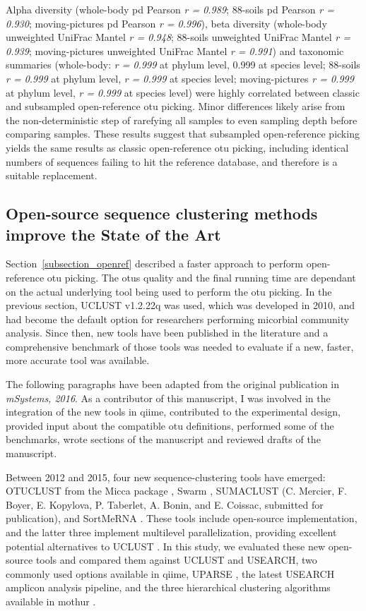 Alpha diversity (whole-body \gls{pd} Pearson \emph{r = 0.989}; 88-soils \gls{pd}
Pearson \emph{r = 0.930}; moving-pictures \gls{pd} Pearson \emph{r = 0.996}),
beta diversity (whole-body unweighted UniFrac Mantel \emph{r = 0.948};
88-soils unweighted UniFrac Mantel \emph{r = 0.939}; moving-pictures
unweighted UniFrac Mantel \emph{r = 0.991}) and taxonomic summaries (whole-body:
\emph{r = 0.999} at phylum level, 0.999 at species level; 88-soils \emph{r = 0.999}
at phylum level, \emph{r = 0.999} at species level; moving-pictures \emph{r = 0.999}
at phylum level, \emph{r = 0.999} at species level) were highly correlated between
classic and subsampled open-reference \gls{otu} picking. Minor differences likely
arise from the non-deterministic step of rarefying all samples to even sampling
depth before comparing samples. These results suggest that subsampled open-reference
picking yields the same results as classic open-reference \gls{otu} picking,
including identical numbers of sequences failing to hit the reference database,
and therefore is a suitable replacement.

\subsection{Open-source sequence clustering methods improve the State of the Art}\label{subsection_soa}

Section~\ref{subsection_openref} described a faster approach to perform open-reference
\gls{otu} picking. The \gls{otu}s quality and the final running time are dependant
on the actual underlying tool being used to perform the \gls{otu} picking. In the
previous section, UCLUST v1.2.22q \cite{Edgar2010} was used, which was
developed in 2010, and had become the default option for researchers performing
micorbial community analysis. Since then, new tools have been published in the
literature and a comprehensive benchmark of those tools was needed to evaluate if
a new, faster, more accurate tool was available.

The following paragraphs have been adapted from the original publication in
\textsl{mSystems, 2016}. As a contributor of this manuscript, I was involved in
the integration of the new tools in \gls{qiime}, contributed to the experimental
design, provided input about the compatible \gls{otu} definitions,
performed some of the benchmarks, wrote sections of the manuscript and
reviewed drafts of the manuscript.

Between 2012 and 2015, four new sequence-clustering tools have emerged: OTUCLUST
from the Micca package \cite{Albanese2015}, Swarm \cite{Mahe2014, Mahe2015},
SUMACLUST (C. Mercier, F. Boyer, E. Kopylova, P. Taberlet, A. Bonin, and E. Coissac,
submitted for publication), and SortMeRNA \cite{Kopylova2012}. These tools
include open-source implementation, and the latter three implement multilevel
parallelization, providing excellent potential alternatives to UCLUST \cite{Edgar2010}.
In this study, we evaluated these new open-source tools and compared them against
UCLUST and USEARCH, two commonly used options available in \gls{qiime}, UPARSE
\cite{Edgar2013}, the latest USEARCH amplicon analysis pipeline, and the three
hierarchical clustering algorithms available in mothur \cite{Schloss2009}.


